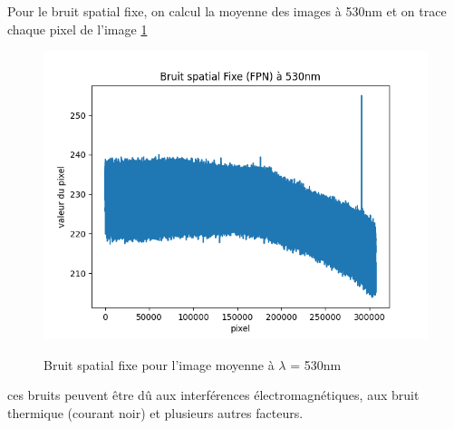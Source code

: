\documentclass{article}
\begin{document}
Pour le bruit spatial fixe, on calcul la moyenne des images à 530nm et on trace chaque pixel de l'image  \ref{fig:BSF}


\begin{figure}[H]
\centering
\includegraphics[scale=0.7]{bruit_spatial_fixe.png}
\label{fig:BSF}
\caption{Bruit spatial fixe pour l'image moyenne à $\lambda$ = 530nm}
\end{figure}

ces bruits peuvent être dû aux interférences électromagnétiques, aux bruit thermique (courant noir) et plusieurs autres facteurs.
\end{document}
